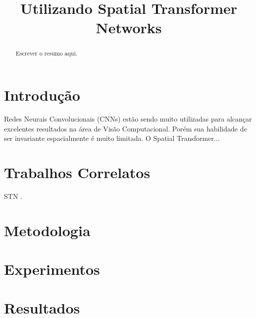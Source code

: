 \documentclass[conference]{IEEEtran}
\begin{document}
\title{Utilizando Spatial Transformer Networks}


\author{
\and
{}
}

\maketitle

\begin{abstract}
Escrever o resumo aqui.
\end{abstract}


\IEEEpeerreviewmaketitle

\section{Introdução}

Redes Neurais Convolucionais (CNNs) estão sendo muito utilizadas para alcançar excelentes resultados na área de Visão Computacional. Porém sua habilidade de ser invariante espacialmente é muito limitada. O Spatial Transformer...

\section{Trabalhos Correlatos}

STN \cite{jaderberg2015spatial}.

\section{Metodologia}


\section{Experimentos}


\section{Resultados}


\end{document}
